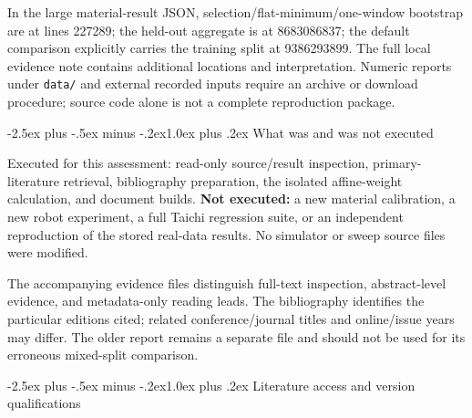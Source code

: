 \documentclass[
  11pt,
]{article}
\makeatletter
\renewcommand\subsection{\needspace{5\baselineskip}\@startsection{subsection}{2}{\z@}%
  {-2.5ex plus -.5ex minus -.2ex}{1.0ex plus .2ex}%
  {\normalfont\sffamily\large\bfseries\color{accent}}}
\makeatother
\begin{document}
In the large material-result JSON, selection/flat-minimum/one-window
bootstrap are at lines 227\textendash{}\allowbreak{}289; the held-out
aggregate is at 86830\textendash{}\allowbreak{}86837; the default
comparison explicitly carries the training split at
93862\textendash{}\allowbreak{}93899. The full local evidence note
contains additional locations and interpretation. Numeric reports under
\texttt{data/\allowbreak{}} and external recorded inputs require an
archive or download procedure; source code alone is not a complete
reproduction package.

\subsection{What was and was not
executed}\label{what-was-and-was-not-executed}

Executed for this assessment: read-only source/result inspection,
primary-literature retrieval, bibliography preparation, the isolated
affine-weight calculation, and document builds. \textbf{Not executed:} a
new material calibration, a new robot experiment, a full Taichi
regression suite, or an independent reproduction of the stored real-data
results. No simulator or sweep source files were modified.

The accompanying evidence files distinguish full-text inspection,
abstract-level evidence, and metadata-only reading leads. The
bibliography identifies the particular editions cited; related
conference/journal titles and online/issue years may differ. The older
report remains a separate file and should not be used for its erroneous
mixed-split comparison.

\subsection{Literature access and version
qualifications}\label{literature-access-and-version-qualifications}
\end{document}
